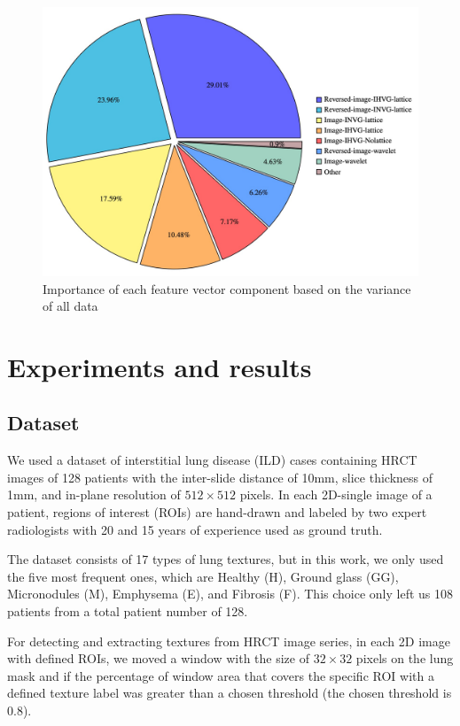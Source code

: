 \documentclass[conference]{IEEEtran}
\begin{document}
\begin{figure}[tbh]
 \includegraphics[width=1\linewidth]{PCA_piechart.png}
   \caption{Importance of each feature vector component based on the variance of all data}
 \label{fig: PCA1}
\end{figure}


\section{Experiments and results}
\subsection{\textbf{Dataset}}
We used a dataset of interstitial lung disease (ILD) \cite{dataset} cases containing HRCT images of 128 patients with the inter-slide distance of 10mm, slice thickness of 1mm, and in-plane resolution of $512\times 512$ pixels. In each 2D-single image of a patient, regions of interest (ROIs) are hand-drawn and labeled by two expert radiologists with 20 and 15 years of experience used as ground truth. 

The dataset consists of 17 types of lung textures, but in this work, we only used the five most frequent ones, which are Healthy (H), Ground glass (GG), Micronodules (M), Emphysema (E), and Fibrosis (F). This choice only left us 108 patients from a total patient number of 128.

For detecting and extracting textures from HRCT image series, in each 2D image with defined ROIs, we moved a window with the size of $32 \times 32 $ pixels on the lung mask and if the percentage of window area that covers the specific ROI with a defined texture label was greater than a chosen threshold (the chosen threshold is 0.8).
\end{document}
